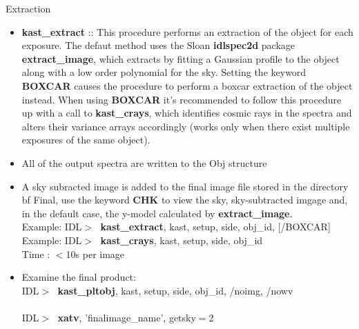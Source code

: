\documentclass[11pt,letterpaper,dvips]{article}
\begin{document}
\begin{enumerate}
\begin{enumerate}
  \end{enumerate}


{\Large  \item Extraction}
  \begin{itemize}
	\item {\bf kast\_extract} ::
	This procedure performs an extraction of the object for each 
	exposure.  The defaut method uses the Sloan {\bf idlspec2d} package
	{\bf extract\_image}, which extracts by fitting a Gaussian profile to 
	the object along with a low order polynomial for the sky.  Setting 
	the keyword {\bf BOXCAR} causes the procedure to perform a 
	boxcar extraction of the object instead.  When using {\bf 
	BOXCAR} it's recommended to follow this procedure up with a 
	call to {\bf kast\_crays}, which identifies cosmic rays in the 
	spectra and alters their variance arrays accordingly (works only 
	when there exist multiple exposures of the same object).  \\ 

	\item  All of the output spectra are written to the Obj structure \\
	\item  A sky subracted image is added to the final image file 
	stored in the directory {bf Final}, use the keyword {\bf CHK} 
	to view the sky, sky-subtracted imgage and, in the default case,
	the y-model calculated by {\bf extract\_image}. \\
         \quad Example: IDL$> \;$ {\bf kast\_extract}, kast, setup, side, obj\_id, [/BOXCAR] \\
         \quad Example: IDL$> \;$ {\bf kast\_crays}, kast, setup, side, obj\_id \\
         \quad Time   : $<$10s per image
	\item Examine the final product: \\
         \quad IDL$> \;$ {\bf kast\_pltobj}, kast, setup, side, obj\_id, /noimg, /nowv \\
	  \\
	 \quad IDL$> \;$ {\bf xatv}, 'finalimage\_name', getsky$=$2 \\
  \end{itemize}


\end{enumerate}
\end{document}
